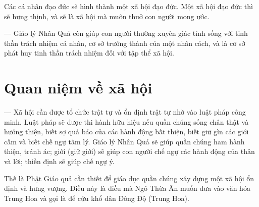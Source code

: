 Các cá nhân đạo đức sẽ hình thành một xã hội đạo đức. Một xã hội đạo đức thì sẽ hưng thịnh, và sẽ là xã hội mà muôn thuở con người mong ước.

— Giáo lý Nhân Quả còn giúp con người thường xuyên giác tỉnh sống với tinh thần trách nhiệm cá nhân, cơ sở trưởng thành của một nhân cách, và là cơ sở phát huy tinh thần trách nhiệm đối với tập thể xã hội.

\section{Quan niệm về xã hội} %
\label{sec:87_xa_hoi}

— Xã hội cần được tổ chức trật tự và ổn định trật tự nhờ vào luật pháp công minh. Luật pháp sẽ được thi hành hữu hiệu nếu quần chúng sống chân thật và hướng thiện, biết sợ quả báo của các hành động bất thiện, biết giữ gìn các giới cấm và biết chế ngự tâm lý. Giáo lý Nhân Quả sẽ giúp quần chúng ham hành thiện, tránh ác; giới (giữ giới) sẽ giúp con người chế ngự các hành động của thân và lời; thiền định sẽ giúp chế ngự ý.

Thế là Phật Giáo quả cần thiết để giáo dục quần chúng xây dựng một xã hội ổn định và hưng vượng. Điều này là điều mà Ngô Thừa Ân muốn đưa vào văn hóa Trung Hoa và gọi là để cứu khổ dân Đông Độ (Trung Hoa).
